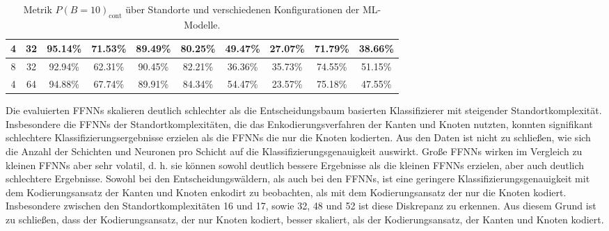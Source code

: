 \begin{table}[h!]
\begin{tabular}{ | c | c | c | c | c | c | c | c | c | c | }
        4 & 32 & 95.14\% & 71.53\% & 89.49\% & 80.25\% & 49.47\% & 27.07\% & 71.79\% & 38.66\% \\\hline
        8 & 32 & 92.94\% & 62.31\% & 90.45\% & 82.21\% & 36.36\% & 35.73\% & 74.55\% & 51.15\% \\\hline
        4 & 64 & 94.88\% & 67.74\% & 89.91\% & 84.34\% & 54.47\% & 23.57\% & 75.18\% & 47.55\% \\\hline
    \end{tabular}
    \caption{Metrik $P(B=10)_{\text{cont}}$ über Standorte und verschiedenen Konfigurationen der ML-Modelle.}
    \label{tab:predictions_by_acc_10_cont}
\end{table}
\newline
\newline
Die evaluierten FFNNs skalieren deutlich schlechter als die Entscheidungsbaum basierten Klassifizierer mit steigender Standortkomplexität.
Insbesondere die FFNNs der Standortkomplexitäten, die das Enkodierungsverfahren der Kanten und Knoten nutzten,
konnten signifikant schlechtere Klassifizierungsergebnisse erzielen als die FFNNs die nur die Knoten kodierten.
Aus den Daten ist nicht zu schließen, wie sich die Anzahl der Schichten und Neuronen pro Schicht auf die Klassifizierungsgenauigkeit auswirkt.
Große FFNNs wirken im Vergleich zu kleinen FFNNs aber sehr volatil, d. h. sie können sowohl deutlich bessere Ergebnisse als die kleinen FFNNs erzielen, aber auch deutlich schlechtere Ergebnisse.
\newline
\newline
Sowohl bei den Entscheidungswäldern, als auch bei den FFNNs, ist eine geringere Klassifizierungsgenauigkeit mit dem Kodierungsansatz der Kanten und Knoten enkodirt
zu beobachten, als mit dem Kodierungsansatz der nur die Knoten kodiert.
Insbesondere zwischen den Standortkomplexitäten 16 und 17, sowie 32, 48 und 52 ist diese Diskrepanz zu erkennen.
Aus diesem Grund ist zu schließen, dass der Kodierungsansatz, der nur Knoten kodiert, besser skaliert, als der Kodierungsansatz, der Kanten und Knoten kodiert.